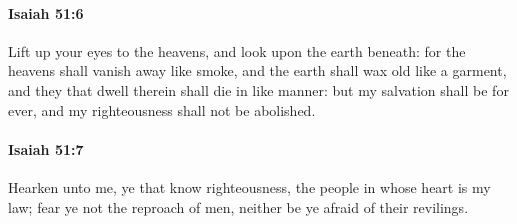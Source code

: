 		\paragraph{Isaiah 51:6} %
			\label{ISAIAH-51-6}

			Lift up your eyes to the heavens, and look upon the earth beneath: for the heavens shall vanish away like smoke, and the earth shall wax old like a garment, and they that dwell therein shall die in like manner: but my salvation shall be for ever, and my righteousness shall not be abolished.


		\paragraph{Isaiah 51:7} %
			\label{ISAIAH-51-7}

			Hearken unto me, ye that know righteousness, the people in whose heart is my law; fear ye not the reproach of men, neither be ye afraid of their revilings.

